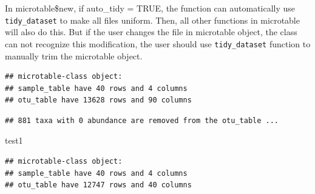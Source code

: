 \documentclass[
]{book}
\newenvironment{Shaded}{\begin{snugshade}}{\end{snugshade}}
\newcommand{\AttributeTok}[1]{\textcolor[rgb]{0.13,0.29,0.53}{#1}}
\newcommand{\ConstantTok}[1]{\textcolor[rgb]{0.56,0.35,0.01}{#1}}
\newcommand{\DecValTok}[1]{\textcolor[rgb]{0.00,0.00,0.81}{#1}}
\newcommand{\FunctionTok}[1]{\textcolor[rgb]{0.13,0.29,0.53}{\textbf{#1}}}
\newcommand{\NormalTok}[1]{#1}
\newcommand{\OtherTok}[1]{\textcolor[rgb]{0.56,0.35,0.01}{#1}}
\newcommand{\SpecialCharTok}[1]{\textcolor[rgb]{0.81,0.36,0.00}{\textbf{#1}}}
\begin{document}
In microtable\$new, if auto\_tidy = TRUE, the function can automatically use \texttt{tidy\_dataset} to make all files uniform.
Then, all other functions in microtable will also do this. But if the user changes the file in microtable object,
the class can not recognize this modification, the user should use \texttt{tidy\_dataset} function to manually trim the microtable object.

\begin{Shaded}
\end{Shaded}

\begin{verbatim}
## microtable-class object:
## sample_table have 40 rows and 4 columns
## otu_table have 13628 rows and 90 columns
\end{verbatim}

\begin{Shaded}
\end{Shaded}

\begin{verbatim}
## 881 taxa with 0 abundance are removed from the otu_table ...
\end{verbatim}

\begin{Shaded}
\begin{Highlighting}[]
\NormalTok{test1}
\end{Highlighting}
\end{Shaded}

\begin{verbatim}
## microtable-class object:
## sample_table have 40 rows and 4 columns
## otu_table have 12747 rows and 40 columns
\end{verbatim}
\end{document}
